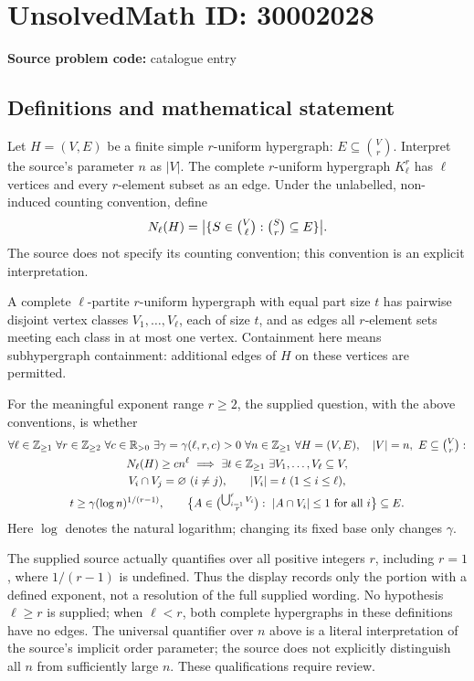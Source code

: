 \documentclass[11pt]{article}
\newcommand{\Z}{\mathbb{Z}}
\newcommand{\R}{\mathbb{R}}
\begin{document}
\section*{UnsolvedMath ID: 30002028}
\textbf{Source problem code:} catalogue entry
\subsection{Definitions and mathematical statement}
Let \(H=(V,E)\) be a finite simple \(r\)-uniform hypergraph: \(E\subseteq\binom{V}{r}\). Interpret the source's parameter \(n\) as \(|V|\). The complete \(r\)-uniform hypergraph \(K^r_\ell\) has \(\ell\) vertices and every \(r\)-element subset as an edge. Under the unlabelled, non-induced counting convention, define
\[
N_\ell(H)=\bigl|\{S\in\tbinom{V}{\ell}:\tbinom{S}{r}\subseteq E\}\bigr|.
\]
The source does not specify its counting convention; this convention is an explicit interpretation.

A complete \(\ell\)-partite \(r\)-uniform hypergraph with equal part size \(t\) has pairwise disjoint vertex classes \(V_1,\ldots,V_\ell\), each of size \(t\), and as edges all \(r\)-element sets meeting each class in at most one vertex. Containment here means subhypergraph containment: additional edges of \(H\) on these vertices are permitted.

For the meaningful exponent range \(r\geq2\), the supplied question, with the above conventions, is whether
\[
\begin{gathered}
\forall\ell\in\Z_{\geq1}\ \forall r\in\Z_{\geq2}\ \forall c\in\R_{>0}\
\exists\gamma=\gamma(\ell,r,c)>0\ \forall n\in\Z_{\geq1}\
\forall H=(V,E),\quad |V|=n,\ E\subseteq\tbinom{V}{r}:\\
N_\ell(H)\geq c n^\ell\ \Longrightarrow\
\exists t\in\Z_{\geq1}\ \exists V_1,\ldots,V_\ell\subseteq V,\\
V_i\cap V_j=\varnothing\ (i\ne j),\qquad |V_i|=t\ (1\leq i\leq\ell),\\
t\geq\gamma(\log n)^{1/(r-1)},\qquad
\bigl\{A\in\tbinom{\bigcup_{i=1}^{\ell}V_i}{r}:\ |A\cap V_i|\leq1\text{ for all }i\bigr\}\subseteq E.
\end{gathered}
\]
Here \(\log\) denotes the natural logarithm; changing its fixed base only changes \(\gamma\).

The supplied source actually quantifies over all positive integers \(r\), including \(r=1\), where \(1/(r-1)\) is undefined. Thus the display records only the portion with a defined exponent, not a resolution of the full supplied wording. No hypothesis \(\ell\geq r\) is supplied; when \(\ell<r\), both complete hypergraphs in these definitions have no edges. The universal quantifier over \(n\) above is a literal interpretation of the source's implicit order parameter; the source does not explicitly distinguish all \(n\) from sufficiently large \(n\). These qualifications require review.
\end{document}
